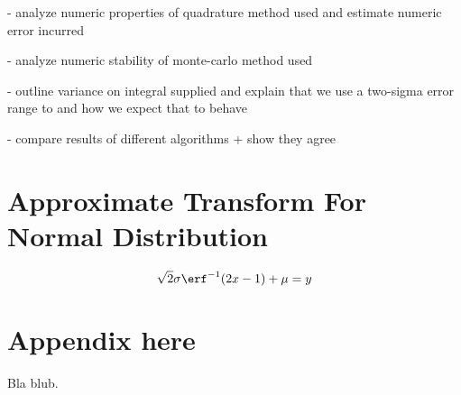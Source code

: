 \documentclass[10pt, a4paper]{article}
\begin{document}
- analyze numeric properties of quadrature method used and estimate numeric error incurred

- analyze numeric stability of monte-carlo method used

- outline variance on integral supplied and explain that we use a two-sigma error range to
  and how we expect that to behave

- compare results of different algorithms + show they agree

\section{Approximate Transform For Normal Distribution}
\begin{equation}
\sqrt{2} \sigma \erf^{-1}(2x - 1) + \mu = y
\end{equation}

{}


\appendix{}

\section{Appendix here}
Bla blub.
\end{document}
